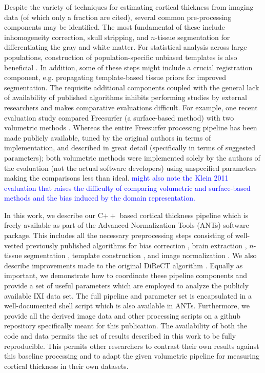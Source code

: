 Despite the variety of techniques for estimating cortical thickness
from imaging data (of which
only a fraction are cited), several common pre-processing components
may be identified.
The most fundamental of these include inhomogeneity correction, skull stripping, and $n$-tissue segmentation 
for differentiating the gray and white matter.  For statistical analysis 
across large populations, construction of population-specific unbiased templates
is also beneficial \cite{}.
In addition, some of these steps might include a crucial registration component, e.g. 
propagating template-based tissue priors for improved segmentation.  The requisite
additional components coupled with the general lack of availability of published
algorithms \cite{kovacevic2006} inhibits performing studies by external researchers 
and makes comparative evaluations difficult.  For example, one recent evaluation 
study \citep{clarkson2011} compared
Freesurfer (a surface-based method) with two volumetric methods \citep{jones2000,das2009}.
Whereas the entire Freesurfer processing pipeline has been made publicly available, 
tuned by the original authors in terms of implementation, and described in great detail 
(specifically in terms of suggested parameters); both volumetric methods were 
implemented solely by the authors of the evaluation (not the actual software developers) using 
unspecified parameters making the comparisons less than
ideal. \textcolor{blue}{might also note the Klein 2011 evaluation that
  raises the difficulty of comparing volumetric and surface-based
  methods and the bias induced by the domain representation.}

In this work, we describe our C$++$ based cortical thickness pipeline
which is freely available as part of the Advanced Normalization Tools
(ANTs) software package.  This includes all the necessary preprocessing steps consisting
of well-vetted previously published algorithms for bias correction \cite{tustison2010},
brain extraction \cite{avants2010a}, $n$-tissue segmentation \cite{avants2011a},
template construction \cite{avants2010}, and image normalization \cite{avants2011}.
We also describe improvements made to the original DiReCT algorithm \cite{das2009}.
Equally as important, we demonstrate how to coordinate
these pipeline components and provide a set of useful parameters
which are employed to analyze the publicly available IXI data set. The
full pipeline and parameter set is 
encapsulated in a well-documented shell script which is also available in ANTs. 
Furthermore, we provide all the derived image data and other processing scripts on 
a github repository specifically meant for this publication.  The
availability of both the code and data permits
the set of results described in this work to be fully reproducible.  This
permits other researchers to contrast their own results against
this baseline processing and to adapt the given volumetric pipeline for measuring
cortical thickness in their own datasets.








